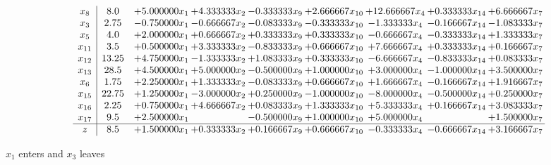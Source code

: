 \documentclass[10pt]{article}
\begin{document}
 \[\begin{array}{c| c c@{\hskip 2pt} c@{\hskip 2pt} c@{\hskip 2pt} c@{\hskip 2pt} c@{\hskip 2pt} c@{\hskip 2pt} c@{\hskip 2pt} }
 x_{8}   &  8.0 & + 5.000000 x_{1} & + 4.333333 x_{2} & -0.333333 x_{9} & + 2.666667 x_{10} & + 12.666667 x_{4} & + 0.333333 x_{14} & + 6.666667 x_{7}\\
 x_{3}   &  2.75 & -0.750000 x_{1} & -0.666667 x_{2} & -0.083333 x_{9} & -0.333333 x_{10} & -1.333333 x_{4} & -0.166667 x_{14} & -1.083333 x_{7}\\
 x_{5}   &  4.0 & + 2.000000 x_{1} & + 0.666667 x_{2} & + 0.333333 x_{9} & + 0.333333 x_{10} & -0.666667 x_{4} & -0.333333 x_{14} & + 1.333333 x_{7}\\
 x_{11}   &  3.5 & + 0.500000 x_{1} & + 3.333333 x_{2} & -0.833333 x_{9} & + 0.666667 x_{10} & + 7.666667 x_{4} & + 0.333333 x_{14} & + 0.166667 x_{7}\\
 x_{12}   &  13.25 & + 4.750000 x_{1} & -1.333333 x_{2} & + 1.083333 x_{9} & + 0.333333 x_{10} & -6.666667 x_{4} & -0.833333 x_{14} & + 0.083333 x_{7}\\
 x_{13}   &  28.5 & + 4.500000 x_{1} & + 5.000000 x_{2} & -0.500000 x_{9} & + 1.000000 x_{10} & + 3.000000 x_{4} & -1.000000 x_{14} & + 3.500000 x_{7}\\
 x_{6}   &  1.75 & + 2.250000 x_{1} & + 1.333333 x_{2} & -0.083333 x_{9} & + 0.666667 x_{10} & + 1.666667 x_{4} & -0.166667 x_{14} & + 1.916667 x_{7}\\
 x_{15}   &  22.75 & + 1.250000 x_{1} & -3.000000 x_{2} & + 0.250000 x_{9} & -1.000000 x_{10} & -8.000000 x_{4} & -0.500000 x_{14} & + 0.250000 x_{7}\\
 x_{16}   &  2.25 & + 0.750000 x_{1} & + 4.666667 x_{2} & + 0.083333 x_{9} & + 1.333333 x_{10} & + 5.333333 x_{4} & + 0.166667 x_{14} & + 3.083333 x_{7}\\
 x_{17}   &  9.5 & + 2.500000 x_{1} &   & -0.500000 x_{9} & + 1.000000 x_{10} & + 5.000000 x_{4} &   & + 1.500000 x_{7}\\
\hline
z    &  8.5 & + 1.500000 x_{1} & + 0.333333 x_{2} & + 0.166667 x_{9} & + 0.666667 x_{10} & -0.333333 x_{4} & -0.666667 x_{14} & + 3.166667 x_{7}\\
\end{array}\]


 $ x_{1} $ enters and $ x_{3} $ leaves 
\end{document}

